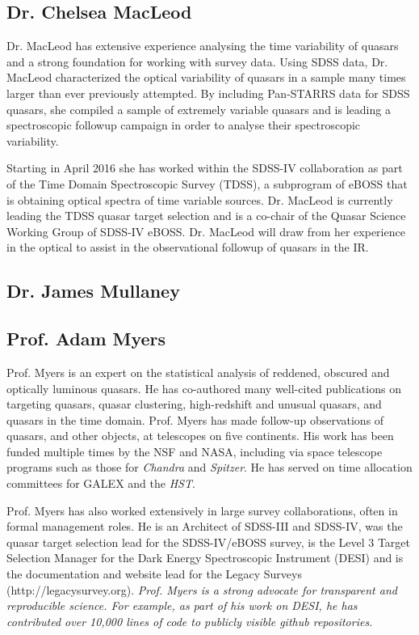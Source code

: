 \subsection*{Dr. Chelsea MacLeod}
Dr. MacLeod has extensive experience analysing the time variability of
quasars and a strong foundation for working with survey data.  Using
SDSS data, Dr. MacLeod characterized the optical variability of
quasars in a sample many times larger than ever previously attempted.
By including Pan-STARRS data for SDSS quasars, she compiled a sample
of extremely variable quasars and is leading a spectroscopic followup
campaign in order to analyse their spectroscopic variability.

\smallskip \smallskip \noindent
Starting in April 2016 she has worked within the SDSS-IV collaboration
as part of the Time Domain Spectroscopic Survey (TDSS), a subprogram
of eBOSS that is obtaining optical spectra of time variable sources.
Dr. MacLeod is currently leading the TDSS quasar target selection and
is a co-chair of the Quasar Science Working Group of SDSS-IV
eBOSS. Dr. MacLeod will draw from her experience in the optical to
assist in the observational followup of quasars in the IR.


\subsection*{Dr. James Mullaney}


\subsection*{Prof. Adam Myers}
Prof. Myers is an expert on the statistical analysis of reddened,
obscured and optically luminous quasars. He has co-authored many
well-cited publications on targeting quasars, quasar clustering,
high-redshift and unusual quasars, and quasars in the time
domain. Prof. Myers has made follow-up observations of quasars, and
other objects, at telescopes on five continents. His work has been
funded multiple times by the NSF and NASA, including via space
telescope programs such as those for {\it Chandra} and {\it Spitzer}. He has
served on time allocation committees for GALEX and the {\it HST}. 

\smallskip \smallskip
\noindent
Prof. Myers has also worked extensively in large survey
collaborations, often in formal management roles. He is an Architect
of SDSS-III and SDSS-IV, was the quasar target selection lead for the
SDSS-IV/eBOSS survey, is the Level 3 Target Selection Manager for the
Dark Energy Spectroscopic Instrument (DESI) and is the documentation
and website lead for the Legacy Surveys
(http://legacysurvey.org). {\it Prof. Myers is a strong advocate for
transparent and reproducible science. For example, as part of his work
on DESI, he has contributed over 10,000 lines of code to publicly
visible github repositories.}


